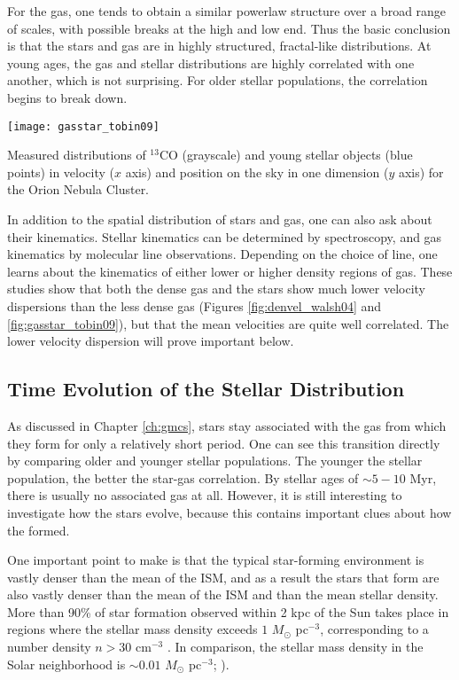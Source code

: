 For the gas, one tends to obtain a similar powerlaw structure over a broad range of scales, with possible breaks at the high and low end. Thus the basic conclusion is that the stars and gas are in highly structured, fractal-like distributions. At young ages, the gas and stellar distributions are highly correlated with one another, which is not surprising. For older stellar populations, the correlation begins to break down.

\begin{marginfigure}
\texttt{[image: gasstar\_tobin09]}
\caption[Spatial and velocity distributions of gas and stars]{
\label{fig:gasstar_tobin09}
Measured distributions of $^{13}$CO (grayscale) and young stellar objects (blue points) in velocity ($x$ axis) and position on the sky in one dimension ($y$ axis) for the Orion Nebula Cluster.
}
\end{marginfigure}

In addition to the spatial distribution of stars and gas, one can also ask about their kinematics. Stellar kinematics can be determined by spectroscopy, and gas kinematics by molecular line observations. Depending on the choice of line, one learns about the kinematics of either lower or higher density regions of gas. These studies show that both the dense gas and the stars show much lower velocity dispersions than the less dense gas (Figures \ref{fig:denvel_walsh04} and \ref{fig:gasstar_tobin09}), but that the mean velocities are quite well correlated. The lower velocity dispersion will prove important below.

\subsection{Time Evolution of the Stellar Distribution}

As discussed in Chapter \ref{ch:gmcs}, stars stay associated with the gas from which they form for only a relatively short period. One can see this transition directly by comparing older and younger stellar populations. The younger the stellar population, the better the star-gas correlation. By stellar ages of $\sim 5-10$ Myr, there is usually no associated gas at all. However, it is still interesting to investigate how the stars evolve, because this contains important clues about how the formed.

One important point to make is that the typical star-forming environment is vastly denser than the mean of the ISM, and as a result the stars that form are also vastly denser than the mean of the ISM and than the mean stellar density. More than 90\% of star formation observed within 2 kpc of the Sun takes place in regions where the stellar mass density exceeds $1$ $M_\odot$ pc$^{-3}$, corresponding to a number density $n > 30$ cm$^{-3}$ \citet{lada03a}. In comparison, the stellar mass density in the Solar neighborhood is $\sim 0.01$ $M_\odot$ pc$^{-3}$; \citealt{holmberg00a}).

